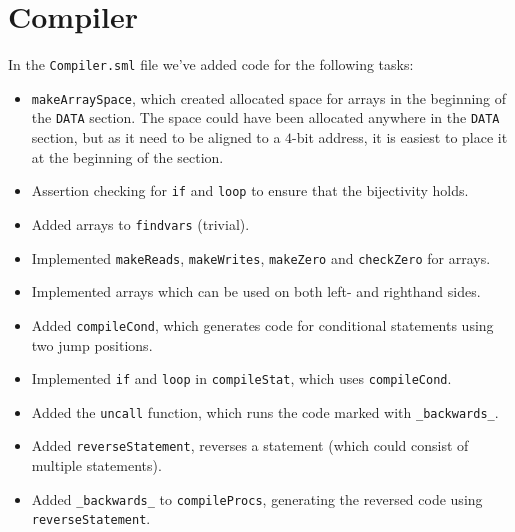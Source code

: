 \section{Compiler}

In the {\tt Compiler.sml} file we've added code for the following tasks:

\begin{itemize}
\item {\tt makeArraySpace}, which created allocated space for arrays in the
      beginning of the {\tt DATA} section. The space could have been allocated
      anywhere in the {\tt DATA} section, but as it need to be aligned to a
      $4$-bit address, it is easiest to place it at the beginning of the
      section.
\item Assertion checking for {\tt if} and {\tt loop} to ensure that the
      bijectivity holds.
\item Added arrays to {\tt findvars} (trivial).
\item Implemented {\tt makeReads}, {\tt makeWrites}, {\tt makeZero} and
      {\tt checkZero} for arrays.
\item Implemented arrays which can be used on both left- and righthand sides.
\item Added {\tt compileCond}, which generates code for conditional statements
      using two jump positions.
\item Implemented {\tt if} and {\tt loop} in {\tt compileStat}, which uses
      {\tt compileCond}.
\item Added the {\tt uncall} function, which runs the code marked with
      {\tt \_backwards\_}.
\item Added {\tt reverseStatement}, reverses a statement (which could consist of
      multiple statements).
\item Added {\tt \_backwards\_} to {\tt compileProcs}, generating the reversed
      code using {\tt reverseStatement}.
\end{itemize}

